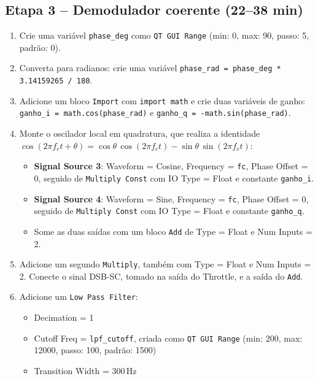 \documentclass[11pt,a4paper]{article}
\begin{document}
\subsection*{Etapa 3 -- Demodulador coerente (22--38 min)}

\begin{instrucao}
\begin{enumerate}[label=\arabic*.]
  \item Crie uma variável \texttt{phase\_deg} como \texttt{QT GUI Range}
    (min: 0, max: 90, passo: 5, padrão: 0).
  \item Converta para radianos: crie uma variável
    \texttt{phase\_rad = phase\_deg * 3.14159265 / 180}.
  \item Adicione um bloco \texttt{Import} com \texttt{import math} e crie
    duas variáveis de ganho:
    \texttt{ganho\_i = math.cos(phase\_rad)} e
    \texttt{ganho\_q = -math.sin(phase\_rad)}.
  \item Monte o oscilador local em quadratura, que realiza a identidade
    $\cos(2\pi f_c t + \theta) = \cos\theta\,\cos(2\pi f_c t)
      - \sin\theta\,\sin(2\pi f_c t)$:
    \begin{itemize}
      \item \textbf{Signal Source 3}: Waveform = Cosine, Frequency =
        \texttt{fc}, Phase Offset = 0, seguido de \texttt{Multiply Const}
        com IO Type = Float e constante \texttt{ganho\_i}.
      \item \textbf{Signal Source 4}: Waveform = Sine, Frequency =
        \texttt{fc}, Phase Offset = 0, seguido de \texttt{Multiply Const}
        com IO Type = Float e constante \texttt{ganho\_q}.
      \item Some as duas saídas com um bloco \texttt{Add} de Type = Float
        e Num Inputs = 2.
    \end{itemize}
  \item Adicione um segundo \texttt{Multiply}, também com Type = Float e
    Num Inputs = 2.  Conecte o sinal DSB-SC, tomado na saída do Throttle,
    e a saída do \texttt{Add}.
  \item Adicione um \texttt{Low Pass Filter}:
    \begin{itemize}
      \item Decimation = 1
      \item Cutoff Freq = \texttt{lpf\_cutoff}, criada como
        \texttt{QT GUI Range} (min: 200, max: 12000, passo: 100,
        padrão: 1500)
      \item Transition Width = 300\,Hz

\end{itemize}
\end{enumerate}
\end{instrucao}
\end{document}
